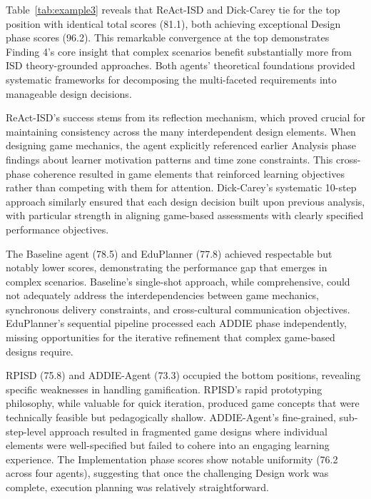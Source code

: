 Table~\ref{tab:example3} reveals that ReAct-ISD and Dick-Carey tie for the top position with identical total scores (81.1), both achieving exceptional Design phase scores (96.2). This remarkable convergence at the top demonstrates Finding 4's core insight that complex scenarios benefit substantially more from ISD theory-grounded approaches. Both agents' theoretical foundations provided systematic frameworks for decomposing the multi-faceted requirements into manageable design decisions.

ReAct-ISD's success stems from its reflection mechanism, which proved crucial for maintaining consistency across the many interdependent design elements. When designing game mechanics, the agent explicitly referenced earlier Analysis phase findings about learner motivation patterns and time zone constraints. This cross-phase coherence resulted in game elements that reinforced learning objectives rather than competing with them for attention. Dick-Carey's systematic 10-step approach similarly ensured that each design decision built upon previous analysis, with particular strength in aligning game-based assessments with clearly specified performance objectives.

The Baseline agent (78.5) and EduPlanner (77.8) achieved respectable but notably lower scores, demonstrating the performance gap that emerges in complex scenarios. Baseline's single-shot approach, while comprehensive, could not adequately address the interdependencies between game mechanics, synchronous delivery constraints, and cross-cultural communication objectives. EduPlanner's sequential pipeline processed each ADDIE phase independently, missing opportunities for the iterative refinement that complex game-based designs require.

RPISD (75.8) and ADDIE-Agent (73.3) occupied the bottom positions, revealing specific weaknesses in handling gamification. RPISD's rapid prototyping philosophy, while valuable for quick iteration, produced game concepts that were technically feasible but pedagogically shallow. ADDIE-Agent's fine-grained, sub-step-level approach resulted in fragmented game designs where individual elements were well-specified but failed to cohere into an engaging learning experience. The Implementation phase scores show notable uniformity (76.2 across four agents), suggesting that once the challenging Design work was complete, execution planning was relatively straightforward.

